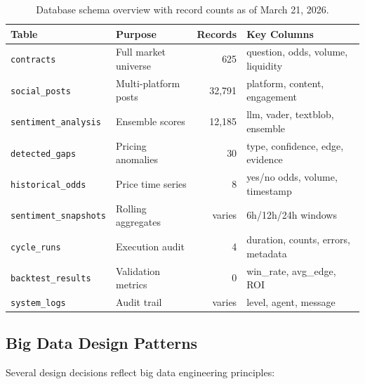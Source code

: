 \documentclass[12pt, letterpaper]{article}
\begin{document}
\begin{table}[H]
\centering
\caption{Database schema overview with record counts as of March 21, 2026.}
\label{tab:schema}
\begin{tabular}{@{}llrl@{}}
\toprule
\textbf{Table} & \textbf{Purpose} & \textbf{Records} & \textbf{Key Columns} \\
\midrule
\texttt{contracts} & Full market universe & 625 & question, odds, volume, liquidity \\
\texttt{social\_posts} & Multi-platform posts & 32,791 & platform, content, engagement \\
\texttt{sentiment\_analysis} & Ensemble scores & 12,185 & llm, vader, textblob, ensemble \\
\texttt{detected\_gaps} & Pricing anomalies & 30 & type, confidence, edge, evidence \\
\texttt{historical\_odds} & Price time series & 8 & yes/no odds, volume, timestamp \\
\texttt{sentiment\_snapshots} & Rolling aggregates & varies & 6h/12h/24h windows \\
\texttt{cycle\_runs} & Execution audit & 4 & duration, counts, errors, metadata \\
\texttt{backtest\_results} & Validation metrics & 0 & win\_rate, avg\_edge, ROI \\
\texttt{system\_logs} & Audit trail & varies & level, agent, message \\
\bottomrule
\end{tabular}
\end{table}

\subsection{Big Data Design Patterns}

Several design decisions reflect big data engineering principles:
\end{document}
